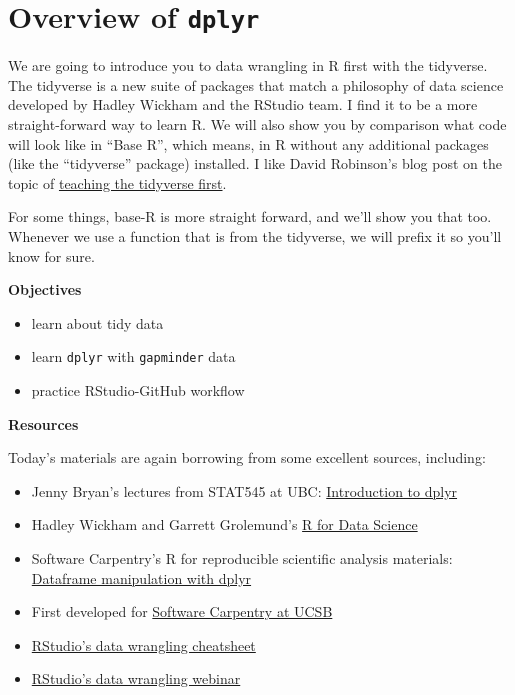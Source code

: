 \documentclass[]{book}
\providecommand{\tightlist}{%
  \setlength{\itemsep}{0pt}\setlength{\parskip}{0pt}}
\theoremstyle{definition}
\theoremstyle{definition}
\theoremstyle{definition}
\theoremstyle{remark}
\begin{document}
\section{\texorpdfstring{Overview of
\texttt{dplyr}}{Overview of dplyr}}\label{overview-of-dplyr}

We are going to introduce you to data wrangling in R first with the
tidyverse. The tidyverse is a new suite of packages that match a
philosophy of data science developed by Hadley Wickham and the RStudio
team. I find it to be a more straight-forward way to learn R. We will
also show you by comparison what code will look like in ``Base R'',
which means, in R without any additional packages (like the
``tidyverse'' package) installed. I like David Robinson's blog post on
the topic of
\href{http://varianceexplained.org/r/teach-hard-way}{teaching the
tidyverse first}.

For some things, base-R is more straight forward, and we'll show you
that too. Whenever we use a function that is from the tidyverse, we will
prefix it so you'll know for sure.

\textbf{Objectives}

\begin{itemize}
\tightlist
\item
  learn about tidy data
\item
  learn \texttt{dplyr} with \texttt{gapminder} data
\item
  practice RStudio-GitHub workflow
\end{itemize}

\textbf{Resources}

Today's materials are again borrowing from some excellent sources,
including:

\begin{itemize}
\tightlist
\item
  Jenny Bryan's lectures from STAT545 at UBC:
  \href{http://stat545.com/block009_dplyr-intro.html}{Introduction to
  dplyr}
\item
  Hadley Wickham and Garrett Grolemund's \href{http://r4ds.had.co.nz/}{R
  for Data Science}
\item
  Software Carpentry's R for reproducible scientific analysis materials:
  \href{http://swcarpentry.github.io/r-novice-gapminder/13-dplyr.html}{Dataframe
  manipulation with dplyr}
\item
  First developed for
  \href{http://remi-daigle.github.io/2016-04-15-UCSB/dplyr/}{Software
  Carpentry at UCSB}
\item
  \href{http://www.rstudio.com/wp-content/uploads/2015/02/data-wrangling-cheatsheet.pdf}{RStudio's
  data wrangling cheatsheet}
\item
  \href{https://www.rstudio.com/resources/webinars/data-wrangling-with-r-and-rstudio/}{RStudio's
  data wrangling webinar}
\end{itemize}
\end{document}
